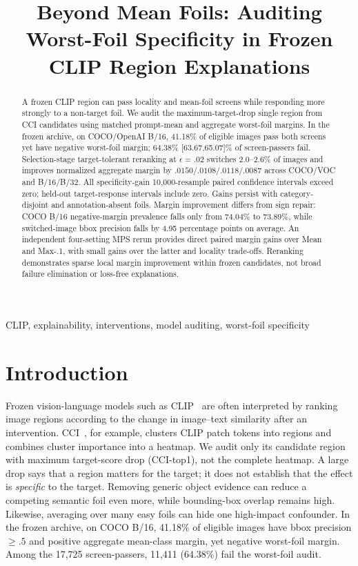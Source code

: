\documentclass[10pt]{article}
\title{Beyond Mean Foils: Auditing Worst-Foil Specificity in Frozen CLIP Region Explanations}
\begin{document}
\maketitle

\begin{abstract}
A frozen CLIP region can pass locality and mean-foil screens while responding
more strongly to a non-target foil. We audit the maximum-target-drop single
region from CCI candidates using matched prompt-mean and aggregate worst-foil
margins. In the frozen archive, on COCO/OpenAI B/16, 41.18\% of eligible images pass both screens yet
have negative worst-foil margin; 64.38\% [63.67,65.07]\% of screen-passers fail.
Selection-stage target-tolerant reranking at
$\epsilon=.02$ switches 2.0--2.6\% of images and improves normalized aggregate
margin by $.0150/.0108/.0118/.0087$ across COCO/VOC and B/16/B/32.
All specificity-gain 10,000-resample paired confidence intervals exceed zero;
held-out target-response intervals include zero. Gains persist with
category-disjoint and annotation-absent foils. Margin improvement differs from
sign repair: COCO B/16 negative-margin prevalence falls only from 74.04\% to
73.89\%, while switched-image bbox precision falls by 4.95 percentage points
on average. An independent four-setting MPS rerun provides direct paired margin gains over Mean and Max-.1, with small gains over the latter and locality trade-offs. Reranking demonstrates sparse local margin improvement within
frozen candidates, not broad failure elimination or loss-free explanations.
\end{abstract}
\begin{keywords}
CLIP, explainability, interventions, model auditing, worst-foil specificity
\end{keywords}

\section{Introduction}
Frozen vision-language models such as CLIP~\cite{radford2021clip} are often interpreted by ranking image regions
according to the change in image--text similarity after an intervention.
CCI~\cite{agarwal2025cci}, for example, clusters CLIP patch tokens into regions
and combines cluster importance into a heatmap. We audit only its candidate
region with maximum target-score drop (CCI-top1), not the complete heatmap. A large drop says
that a region matters for the target; it does not establish that the effect is
\emph{specific} to the target. Removing generic object evidence can reduce a
competing semantic foil even more, while bounding-box overlap remains high.
Likewise, averaging over many easy foils can hide one high-impact confounder.
In the frozen archive, on COCO B/16, 41.18\% of eligible images have bbox precision $\ge .5$ and
positive aggregate mean-class margin, yet negative worst-foil margin.
Among the 17,725 screen-passers, 11,411 (64.38\%) fail the worst-foil audit.
\end{document}
